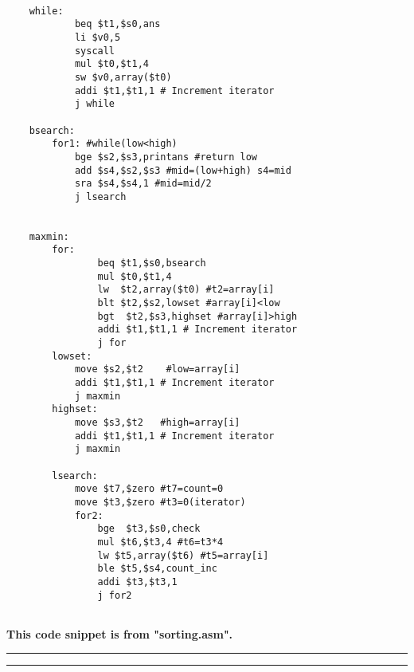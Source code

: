 \documentclass[a4paper,10pt]{article} %
\begin{document}
\begin{codebox} 
\begin{lstlisting}[language=Assembly]

	while:
    		beq $t1,$s0,ans 
    		li $v0,5		 
    		syscall
    		mul $t0,$t1,4
    		sw $v0,array($t0)
    		addi $t1,$t1,1 # Increment iterator
    		j while
	
	bsearch:
		for1: #while(low<high)
			bge $s2,$s3,printans #return low
			add $s4,$s2,$s3 #mid=(low+high) s4=mid
			sra $s4,$s4,1 #mid=mid/2
			j lsearch
	
			
	maxmin:
		for:
    			beq $t1,$s0,bsearch
    			mul $t0,$t1,4
    			lw  $t2,array($t0) #t2=array[i]
    			blt $t2,$s2,lowset #array[i]<low
    			bgt  $t2,$s3,highset #array[i]>high
    			addi $t1,$t1,1 # Increment iterator
    			j for
    	lowset:
    		move $s2,$t2 	#low=array[i]
    		addi $t1,$t1,1 # Increment iterator
    		j maxmin
    	highset:
    		move $s3,$t2   #high=array[i]
    		addi $t1,$t1,1 # Increment iterator
    		j maxmin
    	
    	lsearch:
    		move $t7,$zero #t7=count=0
    		move $t3,$zero #t3=0(iterator)
    		for2:
    			bge  $t3,$s0,check
    			mul $t6,$t3,4 #t6=t3*4
    			lw $t5,array($t6) #t5=array[i]
    			ble $t5,$s4,count_inc
    			addi $t3,$t3,1
    			j for2


\end{lstlisting} 
\end{codebox}
\large{\textbf{This code snippet is from "sorting.asm".}}
\newpage

\rule{\textwidth}{0.5pt}


\rule{\textwidth}{0.5pt}
\end{document}
